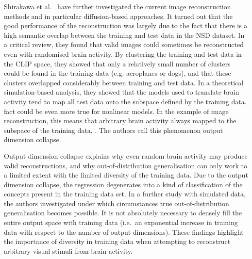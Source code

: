 Shirakawa et al.~\cite{shirakawaSpuriousReconstructionBrain2024} have further investigated the current image reconstruction methods and in particular diffusion-based approaches. It turned out that the good performance of the reconstruction was largely due to the fact that there is a high semantic overlap between the training and test data in the NSD dataset. In a critical review, they found that valid images could sometimes be reconstructed even with randomised brain activity. By clustering the training and test data in the CLIP space, they showed that only a relatively small number of clusters could be found in the training data (e.g. aeroplanes or dogs), and that these clusters overlapped considerably between training and test data. In a theoretical simulation-based analysis, they showed that the models used to translate brain activity tend to map all test data onto the subspace defined by the training data.  fact could be even more true for nonlinear  models. In the example of image reconstruction, this means that arbitrary brain activity  always mapped to the subspace of the training data, . The authors call this phenomenon output dimension collapse. 

Output dimension collapse explains why even random brain activity may produce valid reconstructions, and why out-of-distribution generalisation can only work to a limited extent with the limited diversity of the training data. Due to the  output dimension collapse, the regression degenerates into a kind of classification of the concepts present in the training data set. In a further study with simulated data, the authors investigated under which circumstances true out-of-distribution generalisation becomes possible.  It is not absolutely necessary to densely fill the entire output space with training data (i.e.\ an exponential increase in training data with respect to the number of output dimensions). These findings highlight the importance of diversity in training data when attempting to reconstruct arbitrary visual stimuli from brain activity.

